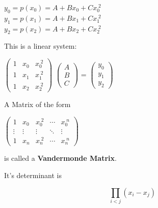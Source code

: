 \documentclass[a4paper,12pt]{report}
\begin{document}
\begin{center}
	$y_0 = p(x_0) = A + Bx_0 + Cx_0 ^{\;2}$\\
	\medskip
	$y_1 = p(x_1) = A + Bx_1 + Cx_1 ^{\;2}$\\
	\medskip
	$y_2 = p(x_2) = A + Bx_2 + Cx_2 ^{\;2}$\\
\end{center}

This is a linear system:

\begin{center}
	$
	\begin{pmatrix}
		1 & x_0 & x_0^{\;2} \\
		1 & x_1 & x_1^{\;2} \\
		1 & x_2 & x_2^{\;2}
	\end{pmatrix}
	$
	\nolinebreak
	$
	\begin{pmatrix}
		A\\
		B\\
		C
	\end{pmatrix}
	$
		=
	$
	\begin{pmatrix}
		y_0\\
		y_1\\
		y_2	
	\end{pmatrix}
	$
\end{center}

\begin{center}
\fbox
{
	\parbox{0.5\textwidth}
	{
	\begin{center}
		A Matrix of the form
		\bigskip
		
			$\begin{pmatrix}
				1 & x_0 & x_0^{\;2} & \cdots & x_0^{\; n}\\
				\vdots & \vdots & \vdots & \ddots & \vdots\\
				1 & x_n & x_n^{\;2} & \cdots & x_n^{\; n}
			\end{pmatrix}$

		\bigskip		
		 is called a \textbf{Vandermonde Matrix}.
	\end{center}
	}
}
\end{center}

\bigskip

	\noindent It's determinant is

\vspace{-0.75cm}

\begin{center}
	\begin{equation*}
		\prod_{i<j}(x_i - x_j)
	\end{equation*}
\end{center}
\end{document}
